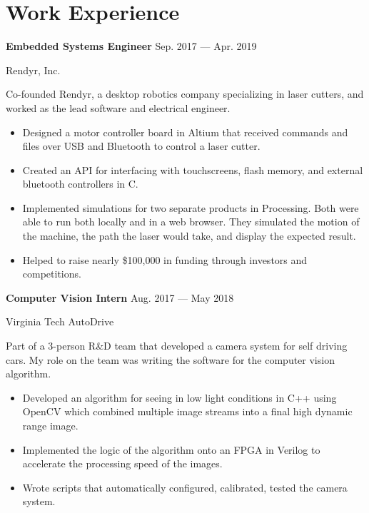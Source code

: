 \section{Work Experience}

\parbox[t][][t]{\linewidth}{
	\parbox{\linewidth}{\textbf{Embedded Systems Engineer}
		\hfill {{Sep. 2017 --- Apr. 2019}}}
	\smallbreak
	\parbox{\linewidth}{Rendyr, Inc.}
	
	\bigskip
	
	Co-founded Rendyr, a desktop robotics company specializing in laser cutters, and worked as the lead software and electrical engineer.
	
	\bigskip
	\begin{itemize}
		
		\item{Designed a motor controller board in Altium that received commands and files over USB and Bluetooth to control a laser cutter.}\\[-.6em]
		
		\item{Created an API for interfacing with touchscreens, flash memory, and external bluetooth controllers in C.}\\[-.6em]
		
		\item{Implemented simulations for two separate products in Processing. Both were able to run both locally and in a web browser. They simulated the motion of the machine, the path the laser would take, and display the expected result.}\\[-.6em]
		
		\item{Helped to raise nearly \$100,000 in funding through investors and competitions.}
		
	\end{itemize}
	\bigskip
	\bigskip
}

\parbox[t][][t]{\linewidth}{
	\parbox{\linewidth}{\textbf{Computer Vision Intern}
		\hfill {{Aug. 2017 --- May 2018}}}
	\smallbreak
	\parbox{\linewidth}{Virginia Tech AutoDrive}
	
	\bigskip
	
	Part of a 3-person R\&D team that developed a camera system for self driving cars. My role on the team was writing the software for the computer vision algorithm.
	
	\bigskip
	\begin{itemize}
		\item{Developed an algorithm for seeing in low light conditions in C++ using OpenCV which combined multiple image streams into a final high dynamic range image.}\\[-.6em]
		
		\item{Implemented the logic of the algorithm onto an FPGA in Verilog to accelerate the processing speed of the images.}\\[-.6em]
		
		\item{Wrote scripts that automatically configured, calibrated, tested the camera system.}
		
	\end{itemize}
	\bigskip
	\bigskip
}

